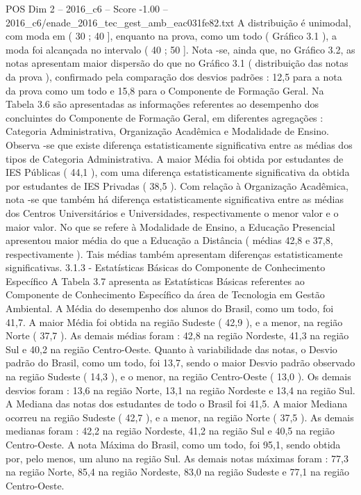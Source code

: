 \begin{textsample}{POS Dim 2 – 2016\_c6 – Score -1.00 – 2016\_c6/enade\_2016\_tec\_gest\_amb\_eac031fe82.txt}
A distribuição é unimodal, com moda em ( 30 ; 40 ], enquanto na prova, como um todo ( Gráfico 3.1 ), a moda foi alcançada no intervalo ( 40 ; 50 ].
Nota -se, ainda que, no Gráfico 3.2, as notas apresentam maior dispersão do que no Gráfico 3.1 ( distribuição das notas da prova ), confirmado pela comparação dos desvios padrões : 12,5 para a nota da prova como um todo e 15,8 para o Componente de Formação Geral.
Na Tabela 3.6 são apresentadas as informações referentes ao desempenho dos concluintes do Componente de Formação Geral, em diferentes agregações : Categoria Administrativa, Organização Acadêmica e Modalidade de Ensino.
Observa -se que existe diferença estatisticamente significativa entre as médias dos tipos de Categoria Administrativa.
A maior Média foi obtida por estudantes de IES Públicas ( 44,1 ), com uma diferença estatisticamente significativa da obtida por estudantes de IES Privadas ( 38,5 ).
Com relação à Organização Acadêmica, nota -se que também há diferença estatisticamente significativa entre as médias dos Centros Universitários e Universidades, respectivamente o menor valor e o maior valor.
No que se refere à Modalidade de Ensino, a Educação Presencial apresentou maior média do que a Educação a Distância ( médias 42,8 e 37,8, respectivamente ).
Tais médias também apresentam diferenças estatisticamente significativas. 3.1.3 - Estatísticas Básicas do Componente de Conhecimento Específico A Tabela 3.7 apresenta as Estatísticas Básicas referentes ao Componente de Conhecimento Específico da área de Tecnologia em Gestão Ambiental.
A Média do desempenho dos alunos do Brasil, como um todo, foi 41,7.
A maior Média foi obtida na região Sudeste ( 42,9 ), e a menor, na região Norte ( 37,7 ).
As demais médias foram : 42,8 na região Nordeste, 41,3 na região Sul e 40,2 na região Centro-Oeste.
Quanto à variabilidade das notas, o Desvio padrão do Brasil, como um todo, foi 13,7, sendo o maior Desvio padrão observado na região Sudeste ( 14,3 ), e o menor, na região Centro-Oeste ( 13,0 ).
Os demais desvios foram : 13,6 na região Norte, 13,1 na região Nordeste e 13,4 na região Sul.
A Mediana das notas dos estudantes de todo o Brasil foi 41,5.
A maior Mediana ocorreu na região Sudeste ( 42,7 ), e a menor, na região Norte ( 37,5 ).
As demais medianas foram : 42,2 na região Nordeste, 41,2 na região Sul e 40,5 na região Centro-Oeste.
A nota Máxima do Brasil, como um todo, foi 95,1, sendo obtida por, pelo menos, um aluno na região Sul.
As demais notas máximas foram : 77,3 na região Norte, 85,4 na região Nordeste, 83,0 na região Sudeste e 77,1 na região Centro-Oeste.

\end{textsample}
